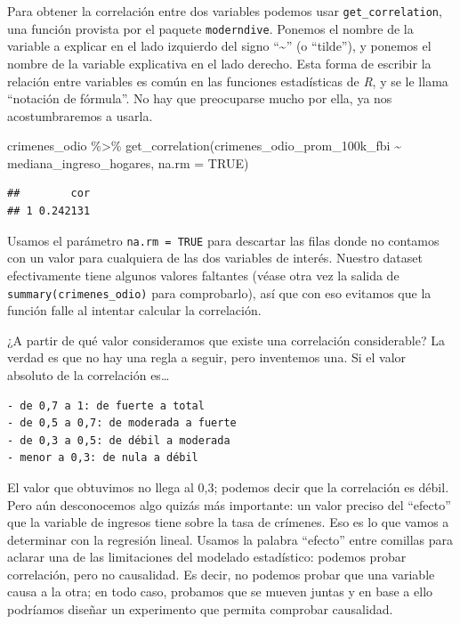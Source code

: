 \documentclass[
]{book}
\newenvironment{Shaded}{\begin{snugshade}}{\end{snugshade}}
\newcommand{\AttributeTok}[1]{\textcolor[rgb]{0.77,0.63,0.00}{#1}}
\newcommand{\ConstantTok}[1]{\textcolor[rgb]{0.00,0.00,0.00}{#1}}
\newcommand{\FunctionTok}[1]{\textcolor[rgb]{0.00,0.00,0.00}{#1}}
\newcommand{\NormalTok}[1]{#1}
\newcommand{\SpecialCharTok}[1]{\textcolor[rgb]{0.00,0.00,0.00}{#1}}
\begin{document}
Para obtener la correlación entre dos variables podemos usar \texttt{get\_correlation}, una función provista por el paquete \texttt{moderndive}. Ponemos el nombre de la variable a explicar en el lado izquierdo del signo ``\textasciitilde{}'' (o ``tilde''), y ponemos el nombre de la variable explicativa en el lado derecho. Esta forma de escribir la relación entre variables es común en las funciones estadísticas de \emph{R}, y se le llama ``notación de fórmula''. No hay que preocuparse mucho por ella, ya nos acostumbraremos a usarla.

\begin{Shaded}
\begin{Highlighting}[]
\NormalTok{crimenes\_odio }\SpecialCharTok{\%\textgreater{}\%} 
  \FunctionTok{get\_correlation}\NormalTok{(crimenes\_odio\_prom\_100k\_fbi }\SpecialCharTok{\textasciitilde{}}\NormalTok{ mediana\_ingreso\_hogares, }
                  \AttributeTok{na.rm =} \ConstantTok{TRUE}\NormalTok{)}
\end{Highlighting}
\end{Shaded}

\begin{verbatim}
##        cor
## 1 0.242131
\end{verbatim}

Usamos el parámetro \texttt{na.rm\ =\ TRUE} para descartar las filas donde no contamos con un valor para cualquiera de las dos variables de interés. Nuestro dataset efectivamente tiene algunos valores faltantes (véase otra vez la salida de \texttt{summary(crimenes\_odio)} para comprobarlo), así que con eso evitamos que la función falle al intentar calcular la correlación.

¿A partir de qué valor consideramos que existe una correlación considerable? La verdad es que no hay una regla a seguir, pero inventemos una. Si el valor absoluto de la correlación es\ldots{}

\begin{verbatim}
- de 0,7 a 1: de fuerte a total
- de 0,5 a 0,7: de moderada a fuerte
- de 0,3 a 0,5: de débil a moderada
- menor a 0,3: de nula a débil
\end{verbatim}

El valor que obtuvimos no llega al 0,3; podemos decir que la correlación es débil. Pero aún desconocemos algo quizás más importante: un valor preciso del ``efecto'' que la variable de ingresos tiene sobre la tasa de crímenes. Eso es lo que vamos a determinar con la regresión lineal. Usamos la palabra ``efecto'' entre comillas para aclarar una de las limitaciones del modelado estadístico: podemos probar correlación, pero no causalidad. Es decir, no podemos probar que una variable causa a la otra; en todo caso, probamos que se mueven juntas y en base a ello podríamos diseñar un experimento que permita comprobar causalidad.
\end{document}
